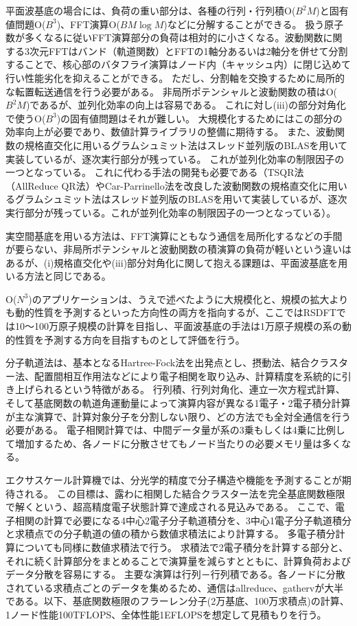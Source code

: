 平面波基底の場合には、負荷の重い部分は、各種の行列・行列積O($B^2M$)と固有値問題O($B^3$)、FFT演算O($BM\log M$)などに分解することができる。
扱う原子数が多くなるに従いFFT演算部分の負荷は相対的に小さくなる。波動関数に関する3次元FFTはバンド（軌道関数）とFFTの1軸分あるいは2軸分を併せて分割することで、核心部のバタフライ演算はノード内（キャッシュ内）に閉じ込めて行い性能劣化を抑えることができる。
ただし、分割軸を交換するために局所的な転置転送通信を行う必要がある。
非局所ポテンシャルと波動関数の積はO($B^2M$)であるが、並列化効率の向上は容易である。
これに対し(iii)の部分対角化で使うO($B^3$)の固有値問題はそれが難しい。
大規模化するためにはこの部分の効率向上が必要であり、数値計算ライブラリの整備に期待する。
また、波動関数の規格直交化に用いるグラムシュミット法はスレッド並列版のBLASを用いて実装しているが、逐次実行部分が残っている。
これが並列化効率の制限因子の一つとなっている。
これに代わる手法の開発も必要である（TSQR法（AllReduce QR法）やCar-Parrinello法を改良した波動関数の規格直交化に用いるグラムシュミット法はスレッド並列版のBLASを用いて実装しているが、逐次実行部分が残っている。これが並列化効率の制限因子の一つとなっている）。

実空間基底を用いる方法は、FFT演算にともなう通信を局所化するなどの手間が要らない、非局所ポテンシャルと波動関数の積演算の負荷が軽いという違いはあるが、(i)規格直交化や(iii)部分対角化に関して抱える課題は、平面波基底を用いる方法と同じである。

O($N^3$)のアプリケーションは、うえで述べたように大規模化と、規模の拡大よりも動的性質を予測するといった方向性の両方を指向するが、ここではRSDFTでは10～100万原子規模の計算を目指し、平面波基底の手法は1万原子規模の系の動的性質を予測する方向を目指すものとして評価を行う。

分子軌道法は、基本となるHartree-Fock法を出発点とし、摂動法、結合クラスター法、配置間相互作用法などにより電子相関を取り込み、計算精度を系統的に引き上げられるという特徴がある。
行列積、行列対角化、連立一次方程式計算、そして基底関数の軌道角運動量によって演算内容が異なる1電子・2電子積分計算が主な演算で、計算対象分子を分割しない限り、どの方法でも全対全通信を行う必要がある。
電子相関計算では、中間データ量が系の3乗もしくは4乗に比例して増加するため、各ノードに分散させてもノード当たりの必要メモリ量は多くなる。

エクサスケール計算機では、分光学的精度で分子構造や機能を予測することが期待される。
この目標は、露わに相関した結合クラスター法を完全基底関数極限で解くという、超高精度電子状態計算で達成される見込みである。
ここで、電子相関の計算で必要になる4中心2電子分子軌道積分を、3中心1電子分子軌道積分と求積点での分子軌道の値の積から数値求積法により計算する。
多電子積分計算についても同様に数値求積法で行う。
求積法で2電子積分を計算する部分と、それに続く計算部分をまとめることで演算量を減らすとともに、計算負荷およびデータ分散を容易にする。
主要な演算は行列－行列積である。各ノードに分散されている求積点ごとのデータを集めるため、通信はallreduce、gathervが大半である。以下、基底関数極限のフラーレン分子(2万基底、100万求積点)の計算、1ノード性能100TFLOPS、全体性能1EFLOPSを想定して見積もりを行う。

